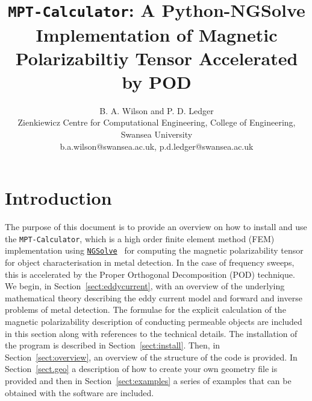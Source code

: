 \documentclass[a4paper,12]{article}
\theoremstyle{definition}
\begin{document}
\title{\texttt{MPT-Calculator}: A Python-NGSolve Implementation of Magnetic Polarizabiltiy Tensor Accelerated by POD}

\author{B. A. Wilson and P. D. Ledger\\
Zienkiewicz Centre for Computational Engineering, College of Engineering,\\Swansea University \\
 b.a.wilson@swansea.ac.uk, p.d.ledger@swansea.ac.uk}

\maketitle


\section{Introduction}

The purpose of this document is to provide an overview on how to install and use the \texttt{MPT-Calculator}, which is a high order finite element method (FEM) implementation using \href{https://ngsolve.org}{\texttt{NGSolve}}~\cite{NGSolve,zaglmayrphd,netgendet} for computing the magnetic polarizability tensor for object characterisation in metal detection. In the case of frequency sweeps, this is accelerated by the Proper Orthogonal Decomposition (POD) technique. We begin, in Section~\ref{sect:eddycurrent}, with an overview of the underlying mathematical theory describing the eddy current model and forward and inverse problems of metal detection. The formulae for the explicit calculation of the magnetic polarizability description of conducting permeable objects are included in this section along with references to the technical details. The installation of the program is described in Section~\ref{sect:install}. Then, in Section~\ref{sect:overview}, an overview of the structure of the code is provided. In Section~\ref{sect.geo} a description of how to create your own geometry file is provided and then in Section~\ref{sect:examples} a series of examples that can be obtained with the software are included.


\end{document}
